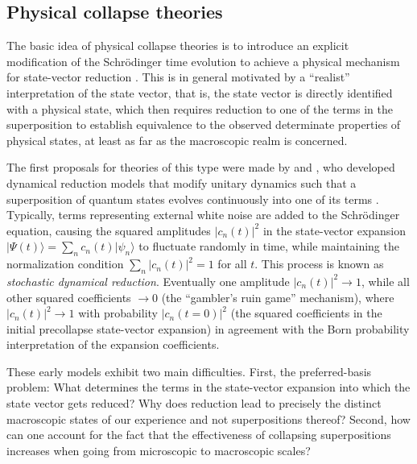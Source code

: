 \documentclass[twocolumn,rmp,aps,amsmath,amsfonts,noshowkeys,noshowpacs]{revtex4}
\newcommand{\ket}[1]{\ensuremath{|{#1\rangle}}}
\begin{document}
\subsection{Physical collapse theories}

The basic idea of physical collapse theories is to introduce an
explicit modification of the Schr\"odinger time evolution to achieve a
physical mechanism for state-vector reduction \citep[for an extensive
recent review, see][]{Bassi:2003:yb}. This is in general motivated by
a ``realist'' interpretation of the state vector, that is, the state
vector is directly identified with a physical state, which then
requires reduction to one of the terms in the superposition to
establish equivalence to the observed determinate properties of
physical states, at least as far as the macroscopic realm is
concerned.

The first proposals for theories of this type were made by
\citet{Pearle:1976:on,Pearle:1979:rq,Pearle:1982:rv} and
\citet{Gisin:1984:qs}, who developed dynamical reduction models that
modify unitary dynamics such that a superposition of quantum states
evolves continuously into one of its terms \citep[see also the review
by][]{Pearle:1999:cr}. Typically, terms representing external white
noise are added to the Schr\"odinger equation, causing the squared
amplitudes $|c_n(t)|^2$ in the state-vector expansion
$\ket{\Psi(t)}=\sum_n c_n(t) \ket{\psi_n}$ to fluctuate randomly in
time, while maintaining the normalization condition $\sum_n
|c_n(t)|^2=1$ for all $t$. This process is known as {\em stochastic
  dynamical reduction}.  Eventually one amplitude $|c_n(t)|^2
\rightarrow 1$, while all other squared coefficients $\rightarrow 0$
(the ``gambler's ruin game'' mechanism), where $|c_n(t)|^2 \rightarrow
1$ with probability $|c_n(t=0)|^2$ (the squared coefficients in the
initial precollapse state-vector expansion) in agreement with the Born
probability interpretation of the expansion coefficients.
   
These early models exhibit two main difficulties.  First, the
preferred-basis problem: What determines the terms in the state-vector
expansion into which the state vector gets reduced? Why does reduction
lead to precisely the distinct macroscopic states of our experience
and not superpositions thereof? Second, how can one account for the
fact that the effectiveness of collapsing superpositions increases
when going from microscopic to macroscopic scales?
\end{document}
